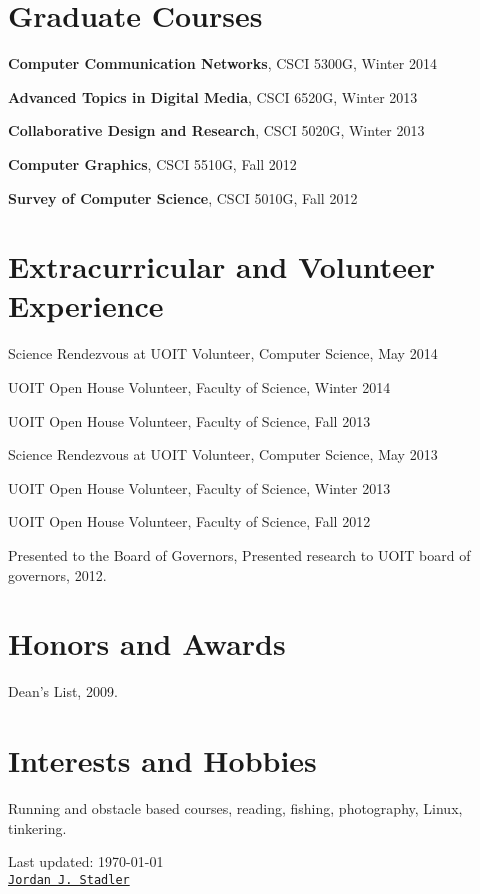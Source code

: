 \documentclass[letterpaper]{article}
\def\footerlink{Jordan J. Stadler}
\renewenvironment{itemize}{
  \begin{list}{}{
    \setlength{\leftmargin}{1.5em}
  }
}{
  \end{list}
}
\begin{document}
\section*{Graduate Courses}
\begin{itemize}
\item\textbf{Computer Communication Networks}, CSCI 5300G, Winter 2014
\item\textbf{Advanced Topics in Digital Media}, CSCI 6520G, Winter 2013
\item\textbf{Collaborative Design and Research}, CSCI 5020G, Winter 2013
\item\textbf{Computer Graphics}, CSCI 5510G, Fall 2012
\item\textbf{Survey of Computer Science}, CSCI 5010G, Fall 2012
\end{itemize}


\section*{Extracurricular and Volunteer Experience}
\begin{itemize}
\item Science Rendezvous at UOIT Volunteer, Computer Science, May 2014
\item UOIT Open House Volunteer, Faculty of Science, Winter 2014
\item UOIT Open House Volunteer, Faculty of Science, Fall 2013
\item Science Rendezvous at UOIT Volunteer, Computer Science, May 2013
\item UOIT Open House Volunteer, Faculty of Science, Winter 2013
\item UOIT Open House Volunteer, Faculty of Science, Fall 2012
\item Presented to the Board of Governors, Presented research to UOIT board of governors, 2012.
\end{itemize}


\section*{Honors and Awards}
\begin{itemize}
\item Dean's List, 2009.
\end{itemize}


\section*{Interests and Hobbies}
\begin{itemize}
\item Running and obstacle based courses, reading, fishing, photography, Linux, tinkering.
\item 
\end{itemize}


\bigskip

\begin{center}
  \begin{footnotesize}
    Last updated: \today \\
    \href{\footerlink}{\texttt{\footerlink}}
  \end{footnotesize}
\end{center}
\end{document}
